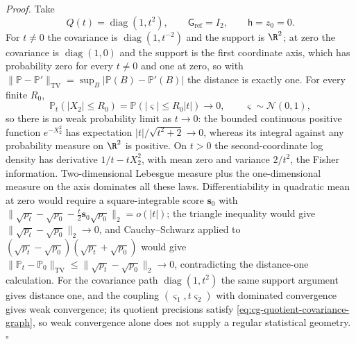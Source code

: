\noindent\emph{Proof.}
Take
\begin{equation}
Q(t)=\operatorname{diag}(1,t^2),\qquad
\mathsf G_{\mathrm{ref}}=I_2,\qquad \mathsf h=z_0=0.
\label{eq:cg-rank-change-example}
\end{equation}
For \(t\neq0\) the covariance is \(\operatorname{diag}(1,t^{-2})\) and the
support is \(\R^2\); at zero the covariance is \(\operatorname{diag}(1,0)\) and the
support is the first coordinate axis, which has probability zero for every
\(t\neq0\) and one at zero, so with
\(\|\mathbb P-\mathbb P'\|_{\mathrm{TV}}=\sup_B|\mathbb P(B)-\mathbb P'(B)|\) the
distance is exactly one. For every finite \(R_0\),
\begin{equation}
\mathbb P_t(|X_2|\leq R_0)
=\mathbb P(|\varsigma|\leq R_0|t|)\longrightarrow0,
\qquad \varsigma\sim\mathcal N(0,1),
\label{eq:cg-rank-change-escape}
\end{equation}
so there is no weak probability limit as \(t\to0\): the bounded continuous
positive function \(e^{-X_2^2}\) has expectation \(|t|/\sqrt{t^2+2}\to0\),
whereas its integral against any probability measure on \(\R^2\) is positive.
On \(t>0\) the second-coordinate log density has derivative \(1/t-tX_2^2\), with
mean zero and variance \(2/t^2\), the Fisher information. Two-dimensional
Lebesgue measure plus the one-dimensional measure on the axis dominates all
these laws. Differentiability in quadratic mean at zero would require a
square-integrable score \(\mathbf s_0\) with
\(\|\sqrt{p_t}-\sqrt{p_0}-\frac t2\mathbf s_0\sqrt{p_0}\|_2=o(|t|)\); the triangle
inequality would give \(\|\sqrt{p_t}-\sqrt{p_0}\|_2\to0\), and Cauchy--Schwarz
applied to \((\sqrt{p_t}-\sqrt{p_0})(\sqrt{p_t}+\sqrt{p_0})\) would give
\(\|\mathbb P_t-\mathbb P_0\|_{\mathrm{TV}}\leq\|\sqrt{p_t}-\sqrt{p_0}\|_2\to0\),
contradicting the distance-one calculation. For the covariance path
\(\operatorname{diag}(1,t^2)\) the same support argument gives distance one,
and the coupling \((\varsigma_1,t\varsigma_2)\) with dominated convergence gives weak
convergence; its quotient precisions satisfy
\eqref{eq:cg-quotient-covariance-graph}, so weak convergence alone does not
supply a regular statistical geometry. \(\square\)

